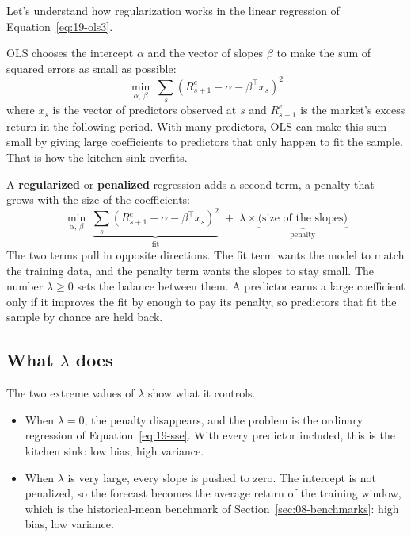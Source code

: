 Let's understand how regularization works in the linear regression of Equation~\eqref{eq:19-ols3}. 

OLS chooses the intercept $\alpha$ and the vector of slopes $\beta$ to make the sum of squared errors as small as possible:
\begin{equation}
  \min_{\alpha,\,\beta} \; \sum_{s} \left(R^{e}_{s+1} - \alpha - \beta^{\top} x_s\right)^2
  \label{eq:19-sse}
\end{equation}
where $x_s$ is the vector of predictors observed at $s$ and $R^{e}_{s+1}$ is the market's excess return in the following period. With many predictors, OLS can make this sum small by giving large coefficients to predictors that only happen to fit the sample. That is how the kitchen sink overfits.

A \textbf{regularized} or \textbf{penalized} regression adds a second term, a penalty that grows with the size of the coefficients:
\begin{equation}
  \min_{\alpha,\,\beta} \; \underbrace{\sum_{s} \left(R^{e}_{s+1} - \alpha - \beta^{\top} x_s\right)^2}_{\text{fit}}
  \; + \; \lambda \times \underbrace{\text{(size of the slopes)}}_{\text{penalty}}
  \label{eq:19-penalty}
\end{equation}
The two terms pull in opposite directions. The fit term wants the model to match the training data, and the penalty term wants the slopes to stay small. The number $\lambda \ge 0$ sets the balance between them. A predictor earns a large coefficient only if it improves the fit by enough to pay its penalty, so predictors that fit the sample by chance are held back.

\subsection{What \texorpdfstring{$\lambda$}{lambda} does}

The two extreme values of $\lambda$ show what it controls.

\begin{itemize}
  \item When $\lambda = 0$, the penalty disappears, and the problem is the ordinary regression of Equation~\eqref{eq:19-sse}. With every predictor included, this is the kitchen sink: low bias, high variance.
  \item When $\lambda$ is very large, every slope is pushed to zero. The intercept is not penalized, so the forecast becomes the average return of the training window, which is the historical-mean benchmark of Section~\ref{sec:08-benchmarks}: high bias, low variance.
\end{itemize}

